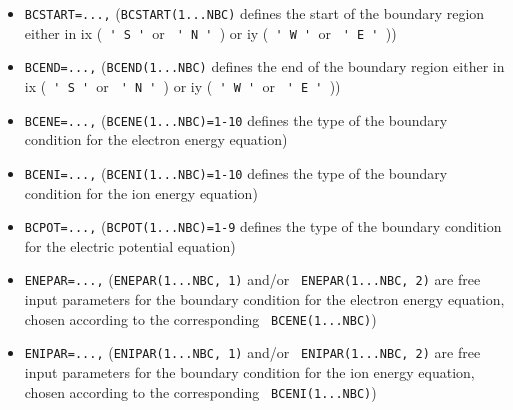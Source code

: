\documentclass[11pt]{article}
\begin{document}
\begin{itemize}
\item  \texttt{BCSTART=...,} (\texttt{BCSTART(1...NBC)} defines the start of
the boundary region either in ix (\texttt{%
\'{}%
S%
\'{}%
}or \texttt{%
\'{}%
N%
\'{}%
}) or iy (\texttt{%
\'{}%
W%
\'{}%
}or \texttt{%
\'{}%
E%
\'{}%
}))

\item  \texttt{BCEND=...,} (\texttt{BCEND(1...NBC)} defines the end of the
boundary region either in ix (\texttt{%
\'{}%
S%
\'{}%
}or \texttt{%
\'{}%
N%
\'{}%
}) or iy (\texttt{%
\'{}%
W%
\'{}%
}or \texttt{%
\'{}%
E%
\'{}%
}))

\item  \texttt{BCENE=...,} (\texttt{BCENE(1...NBC)=1-10} defines the type of
the boundary condition for the electron energy equation)

\item  \texttt{BCENI=...,} (\texttt{BCENI(1...NBC)=1-10} defines the type of
the boundary condition for the ion energy equation)

\item  \texttt{BCPOT=...,} (\texttt{BCPOT(1...NBC)=1-9} defines the type of
the boundary condition for the electric potential equation)

\item  \texttt{ENEPAR=...,} (\texttt{ENEPAR(1...NBC, 1)} and/or \texttt{%
ENEPAR(1...NBC, 2)} are free input parameters for the boundary condition for
the electron energy equation, chosen according to the corresponding \texttt{%
BCENE(1...NBC)})

\item  \texttt{ENIPAR=...,} (\texttt{ENIPAR(1...NBC, 1)} and/or \texttt{%
ENIPAR(1...NBC, 2)} are free input parameters for the boundary condition for
the ion energy equation, chosen according to the corresponding \texttt{%
BCENI(1...NBC)})


\end{itemize}
\end{document}
